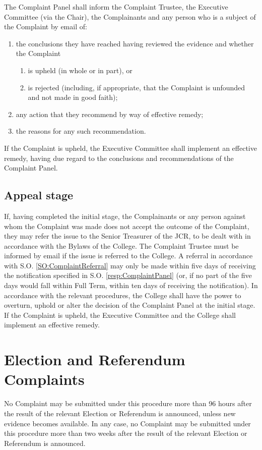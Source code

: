 \npara \label{resp:ComplaintPanel} The Complaint Panel shall inform the Complaint Trustee, the Executive Committee (via the Chair), the Complainants and any person who is a subject of the Complaint by email of:
\begin{enumerate}
\item the conclusions they have reached having reviewed the evidence and whether the Complaint
\begin{enumerate}
\item is upheld (in whole or in part), or
\item is rejected (including, if appropriate, that the Complaint is unfounded and not made in good faith);
\end{enumerate}
\item any action that they recommend by way of effective remedy;
\item the reasons for any such recommendation.
\end{enumerate}
\npara If the Complaint is upheld, the Executive Committee shall implement an effective remedy, having due regard to the conclusions and recommendations of the Complaint Panel.
\subsection{Appeal stage} \label{ssec:ComplaintsAppeal}
\npara \label{SO:ComplaintReferral} If, having completed the initial stage, the Complainants or any person against whom the Complaint was made does not accept the outcome of the Complaint, they may refer the issue to the Senior Treasurer of the JCR, to be dealt with in accordance with the Bylaws of the College.  The Complaint Trustee must be informed by email if the issue is referred to the College.
\npara A referral in accordance with S.O. \ref{SO:ComplaintReferral} may only be made within five days of receiving the notification specified in S.O. \ref{resp:ComplaintPanel} (or, if no part of the five days would fall within Full Term, within ten days of receiving the notification).
\npara In accordance with the relevant procedures, the College shall have the power to overturn, uphold or alter the decision of the Complaint Panel at the initial stage.
\npara If the Complaint is upheld, the Executive Committee and the College shall implement an effective remedy.
\section{Election and Referendum Complaints} \label{sec:ElectionReferendumComplaints}
\npara No Complaint may be submitted under this procedure more than 96 hours after the result of the relevant Election or Referendum is announced, unless new evidence becomes available.  In any case, no Complaint may be submitted under this procedure more than two weeks after the result of the relevant Election or Referendum is announced.
